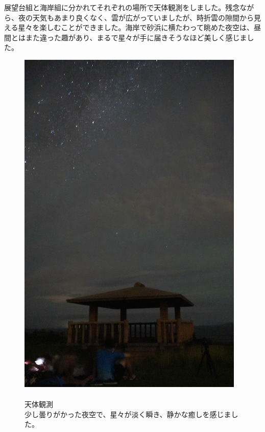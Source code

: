 \documentclass[../main]{subfiles}
\begin{document}
展望台組と海岸組に分かれてそれぞれの場所で天体観測をしました。残念ながら、夜の天気もあまり良くなく、雲が広がっていましたが、時折雲の隙間から見える星々を楽しむことができました。海岸で砂浜に横たわって眺めた夜空は、昼間とはまた違った趣があり、まるで星々が手に届きそうなほど美しく感じました。
\begin{figure}[H]
  \begin{minipage}[b]{0.48\columnwidth}
    \centering
    \includegraphics[width=0.8\columnwidth]{figure/3nitimeyoru.jpg}
  \end{minipage}
  \hspace{0.04\columnwidth} %
  \begin{minipage}[b]{0.48\columnwidth}
    \caption{\\
    天体観測\\
    少し曇りがかった夜空で、星々が淡く瞬き、静かな癒しを感じました。
    }
  \end{minipage}
\end{figure}
\end{document}
